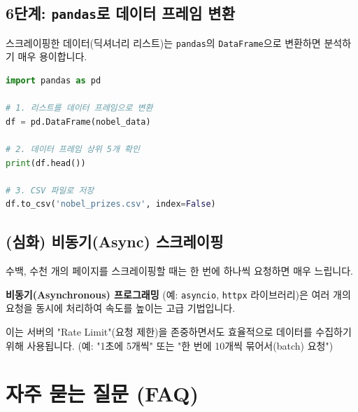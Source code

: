 \documentclass[11pt,a4paper]{book}
\theoremstyle{definition}
\begin{document}
\subsection{6단계: \texttt{pandas}로 데이터 프레임 변환}
스크레이핑한 데이터(딕셔너리 리스트)는 \texttt{pandas}의 \texttt{DataFrame}으로 변환하면 분석하기 매우 용이합니다.

\begin{lstlisting}[language=Python, caption={pandas DataFrame으로 변환 및 저장}, label={code:pandas}, breaklines=true]
import pandas as pd

# 1. 리스트를 데이터 프레임으로 변환
df = pd.DataFrame(nobel_data)

# 2. 데이터 프레임 상위 5개 확인
print(df.head())

# 3. CSV 파일로 저장
df.to_csv('nobel_prizes.csv', index=False)
\end{lstlisting}

\subsection{(심화) 비동기(Async) 스크레이핑}
수백, 수천 개의 페이지를 스크레이핑할 때는 한 번에 하나씩 요청하면 매우 느립니다.

\textbf{비동기(Asynchronous) 프로그래밍} (예: \texttt{asyncio}, \texttt{httpx} 라이브러리)은 여러 개의 요청을 동시에 처리하여 속도를 높이는 고급 기법입니다.

이는 서버의 "Rate Limit"(요청 제한)을 존중하면서도 효율적으로 데이터를 수집하기 위해 사용됩니다. (예: "1초에 5개씩" 또는 "한 번에 10개씩 묶어서(batch) 요청")


\section{자주 묻는 질문 (FAQ)}
\end{document}
